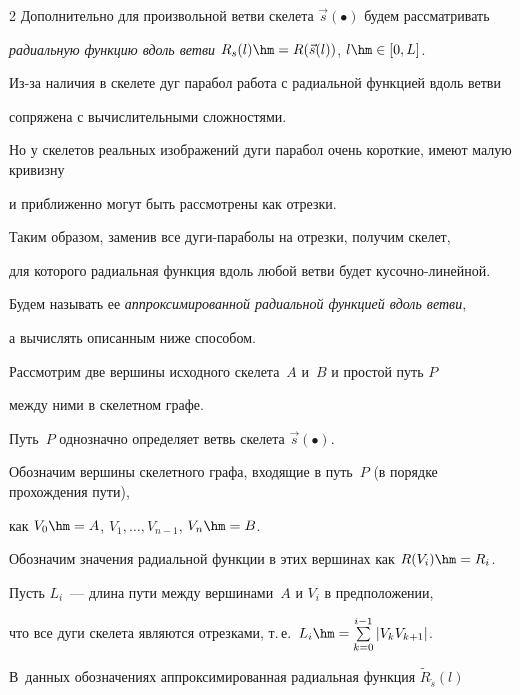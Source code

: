 \begin{multicols}{2}
Дополнительно для произвольной ветви скелета $\vec s(\bullet)$ будем рассматривать 


\textit{радиальную функцию вдоль ветви} $R_{s}(l) \hm= R(\vec s(l))$, $l \hm\in [0, L]$.





Из-за наличия в скелете дуг парабол работа с радиальной функцией вдоль ветви 


сопряжена с вычислительными сложностями.


Но у скелетов реальных изображений дуги парабол очень короткие, имеют малую кривизну 


и приближенно могут быть рассмотрены как отрезки.


Таким образом, заменив все ду\-ги-па\-ра\-бо\-лы на отрезки, получим скелет, 


для которого радиальная функция вдоль любой ветви будет ку\-соч\-но-ли\-ней\-ной.


Будем называть ее \textit{аппроксимированной радиальной функцией вдоль ветви}, 


а вычислять описанным ниже способом.





Рассмотрим две вершины исходного скелета~$A$ и~$B$ и простой путь $P$ 


между ними в скелетном графе.


Путь~$P$ однозначно определяет ветвь скелета $\vec s(\bullet)$.





Обозначим вершины скелетного графа, входящие в путь~$P$ (в порядке прохождения пути), 


как $V_0 \hm= A$, $V_1, \dots, V_{n-1}$, $V_n \hm= B$.





Обозначим значения радиальной функции в этих вершинах как $R(V_i) \hm= R_i$.





Пусть $L_i$~--- длина пути между вершинами~$A$ и $V_i$ в предположении, 


что все дуги скелета являются отрезками, т.\,е.\ $L_i \hm= \sum\limits_{k=0}^{i-1} |V_{k}V_{k+1}|$.





В~данных обозначениях аппроксимированная радиальная функция $\tilde R_{\tilde s}(l)$ 



\end{multicols}
